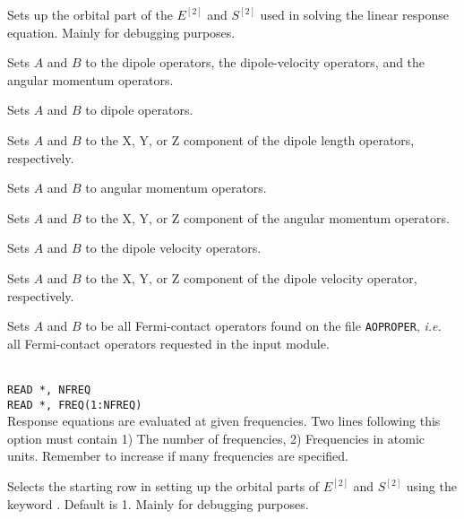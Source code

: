 \begin{description}

\item{} Sets up the orbital part of the $E^{\left[2\right]}$
  and $S^{\left[2\right]}$ used in solving the linear response
  equation. Mainly for debugging purposes.

\item{}
Sets $A$ and $B$ to the dipole operators,
the dipole-velocity operators,
and the angular momentum operators.

\item{}
Sets $A$ and $B$ to dipole operators.

\item{}
Sets $A$ and $B$ to the X, Y, or Z component of the dipole length operators, respectively.

\item{}
Sets $A$ and $B$ to angular momentum operators.

\item{}
Sets $A$ and $B$ to the X, Y, or Z component of the angular momentum operators.

\item{}
Sets $A$ and $B$ to the dipole velocity operators.

\item{}
Sets $A$ and $B$ to the X, Y, or Z component of the dipole velocity
operator, respectively.

\item{} Sets $A$ and $B$ to be all Fermi-contact operators
  found on the file \verb|AOPROPER|, {\it i.e.\/} all Fermi-contact
  operators requested in the  input module.

\item{}\\
\verb|READ *, NFREQ|\\
\verb|READ *, FREQ(1:NFREQ)|\\
Response equations are evaluated at given
frequencies. Two lines following
this option must contain 1) The number of frequencies, 2) Frequencies
in atomic units.
Remember to increase  if many frequencies are specified.

\item{} Selects the starting row in setting up the orbital
  parts of $E^{\left[2\right]}$
  and $S^{\left[2\right]}$ using the keyword . Default is
  1. Mainly for debugging purposes.


\end{description}
